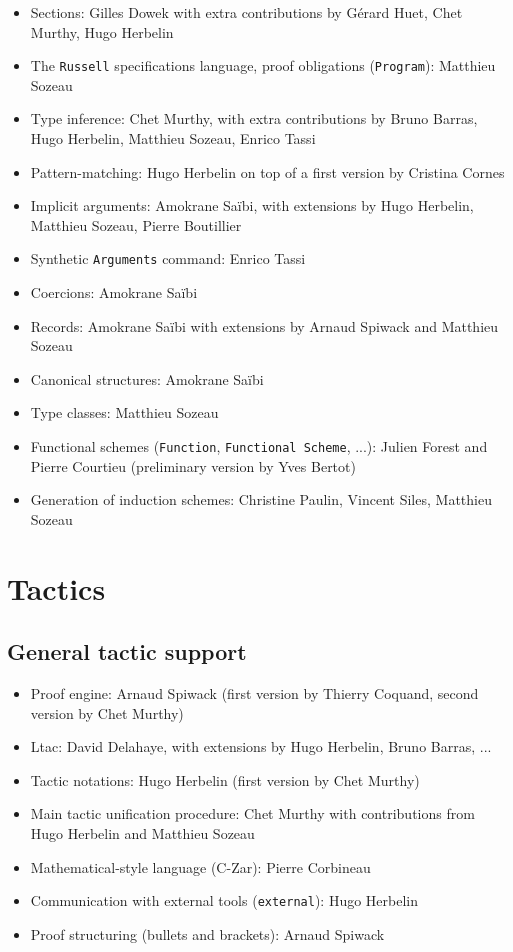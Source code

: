 \documentclass{article}
\begin{document}
\begin{itemize}
\item Sections: Gilles Dowek with extra contributions by Gérard
  Huet, Chet Murthy, Hugo Herbelin
\item The \texttt{Russell} specifications language, proof obligations (\texttt{Program}): Matthieu Sozeau
\item Type inference: Chet Murthy, with extra contributions by Bruno
  Barras, Hugo Herbelin, Matthieu Sozeau, Enrico Tassi
\item Pattern-matching: Hugo Herbelin on top of a first version by
  Cristina Cornes
\item Implicit arguments: Amokrane Saïbi, with extensions by Hugo
  Herbelin, Matthieu Sozeau, Pierre Boutillier
\item Synthetic {\tt Arguments} command: Enrico Tassi
\item Coercions: Amokrane Saïbi
\item Records: Amokrane Saïbi with extensions by Arnaud Spiwack and
  Matthieu Sozeau
\item Canonical structures: Amokrane Saïbi
\item Type classes: Matthieu Sozeau
\item Functional schemes (\texttt{Function}, \texttt{Functional Scheme}, ...): Julien Forest and Pierre Courtieu (preliminary version by Yves Bertot)
\item Generation of induction schemes: Christine Paulin, Vincent
  Siles, Matthieu Sozeau
 \end{itemize}

\section{Tactics}

\subsection{General tactic support}

\begin{itemize}
\item Proof engine: Arnaud Spiwack (first version by Thierry Coquand, second version by Chet Murthy)
\item Ltac: David Delahaye, with extensions by Hugo Herbelin, Bruno Barras, ...
\item Tactic notations: Hugo Herbelin (first version by Chet Murthy)
\item Main tactic unification procedure: Chet Murthy with
  contributions from Hugo Herbelin and Matthieu Sozeau
\item Mathematical-style language (C-Zar): Pierre Corbineau
\item Communication with external tools (\texttt{external}): Hugo Herbelin
\item Proof structuring (bullets and brackets): Arnaud Spiwack
\end{itemize}
\end{document}
